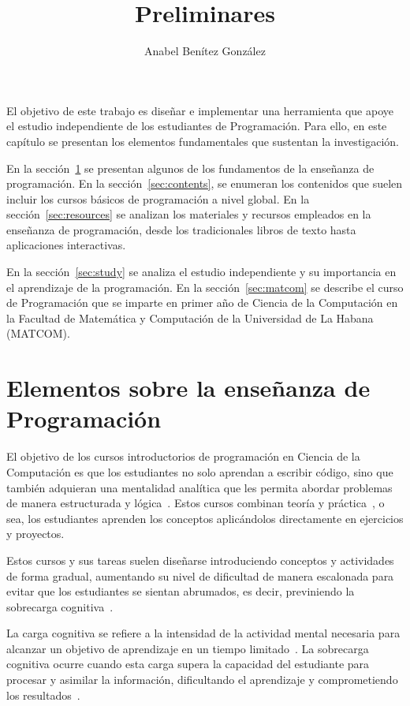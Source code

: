 \documentclass{article}
\title{Preliminares}
\author{Anabel Benítez González}
\date{}
\begin{document}

\maketitle

El objetivo de este trabajo es diseñar e implementar una herramienta que apoye el estudio independiente de los estudiantes de Programación. Para ello, en este capítulo se presentan los elementos fundamentales que sustentan la investigación.

En la sección~\ref{sec:ensenanza_programacion} se presentan algunos de los fundamentos de la enseñanza de programación. En la sección~\ref{sec:contents}, se enumeran los contenidos que suelen incluir los cursos básicos de programación a nivel global. En la sección~\ref{sec:resources} se analizan los materiales y recursos empleados en la enseñanza de programación, desde los tradicionales libros de texto hasta aplicaciones interactivas.

En la sección~\ref{sec:study} se analiza el estudio independiente y su importancia en el aprendizaje de la programación. En la sección~\ref{sec:matcom} se describe el curso de Programación que se imparte en primer año de Ciencia de la Computación en la Facultad de Matemática y Computación de la Universidad de La Habana (\mbox{MATCOM}).

\section{Elementos sobre la enseñanza de Programación}\label{sec:ensenanza_programacion}

El objetivo de los cursos introductorios de programación en Ciencia de la Computación es que los estudiantes no solo aprendan a escribir código, sino que también adquieran una mentalidad analítica que les permita abordar problemas de manera estructurada y lógica~\cite{JOHNLEMAY2021100056}. Estos cursos combinan teoría y práctica~\cite{Sarsa_2022}, o sea, los estudiantes aprenden los conceptos aplicándolos directamente en ejercicios y proyectos.

Estos cursos y sus tareas suelen diseñarse introduciendo conceptos y actividades de forma gradual, aumentando su nivel de dificultad de manera escalonada para evitar que los estudiantes se sientan abrumados, es decir, previniendo la sobrecarga cognitiva~\cite{duran2021clt}.

La carga cognitiva se refiere a la intensidad de la actividad mental necesaria para alcanzar un objetivo de aprendizaje en un tiempo limitado~\cite{duran2021clt}. La sobrecarga cognitiva ocurre cuando esta carga supera la capacidad del estudiante para procesar y asimilar la información, dificultando el aprendizaje y comprometiendo los resultados~\cite{duran2021clt}. 
\end{document}
